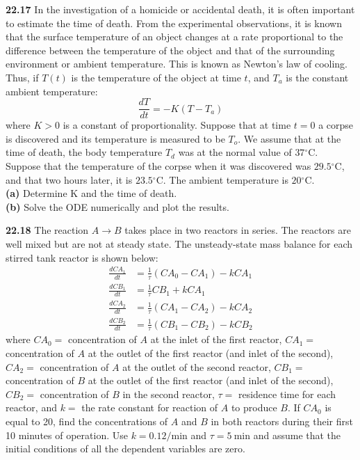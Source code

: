 \begin{multicols}{2}
    \noindent\textbf{22.17} In the investigation of a homicide or accidental death, it is often important to estimate the time of death. From the experimental observations, it is known that the surface temperature of an object changes at a rate proportional to the difference between the temperature of the object and that of the surrounding environment or ambient temperature.
    This is known as Newton's law of cooling. Thus, if $T(t)$ is the temperature of the object at time $t$, and $T_{a}$ is the constant ambient temperature:
    $$
    \frac{d T}{d t}=-K\left(T-T_{a}\right)
    $$
    where $K>0$ is a constant of proportionality. Suppose that at time $t=0$ a corpse is discovered and its temperature is measured to be $T_{o}$. We assume that at the time of death, the body temperature $T_{d}$ was at the normal value of $37{ }^{\circ} \mathrm{C}$. Suppose that the temperature of the corpse when it was discovered was $29.5{ }^{\circ} \mathrm{C}$, and that two hours later, it is $23.5{ }^{\circ} \mathrm{C}$.
    The ambient temperature is $20{ }^{\circ} \mathrm{C}$.\\
    \textbf{(a)} Determine K and the time of death.\\
    \textbf{(b)} Solve the ODE numerically and plot the results.\vspace{2mm}

    \noindent\textbf{22.18} The reaction $A \rightarrow B$ takes place in two reactors in series. The reactors are well mixed but are not at steady state. The unsteady-state mass balance for each stirred tank reactor is shown below:
    $$
    \begin{aligned}
    \frac{d C A_{1}}{d t} &=\frac{1}{\tau}\left(C A_{0}-C A_{1}\right)-k C A_{1} \\
    \frac{d C B_{1}}{d t} &=\frac{1}{\tau} C B_{1}+k C A_{1} \\
    \frac{d C A_{2}}{d t} &=\frac{1}{\tau}\left(C A_{1}-C A_{2}\right)-k C A_{2} \\
    \frac{d C B_{2}}{d t} &=\frac{1}{\tau}\left(C B_{1}-C B_{2}\right)-k C B_{2}
    \end{aligned}
    $$
    where $C A_{0}=$ concentration of $A$ at the inlet of the first reactor, $C A_{1}=$ concentration of $A$ at the outlet of the first reactor (and inlet of the second), $C A_{2}=$ concentration of $A$ at the outlet of the second reactor,
     $C B_{1}=$ concentration of $B$ at the outlet of the first reactor (and inlet of the second), $C B_{2}=$ concentration of $B$ in the second reactor, $\tau=$ residence time for each reactor, and $k=$ the rate constant for reaction of $A$ to produce $B$.
    If $C A_{0}$ is equal to 20, find the concentrations of $A$ and $B$ in both reactors during their first 10 minutes of operation. Use $k=0.12 / \mathrm{min}$ and $\tau=5 \mathrm{~min}$ and assume that the initial conditions of all the dependent variables are zero.\vspace{2mm}


\end{multicols}

